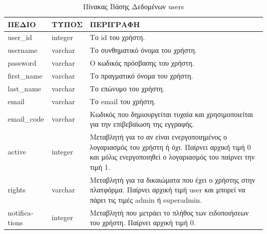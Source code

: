 \begin{table}[t]
\centering
\begin{tabular}{|m{2.5cm}|m{2cm}|m{9cm}|}
\hline
\rowcolor{gray} 
ΠΕΔΙΟ & ΤΥΠΟΣ & ΠΕΡΙΓΡΑΦΗ \\
\hline\hline
\textlatin{user\_id} & \textlatin{integer} & Το \textlatin{id} του χρήστη. \\ 
\textlatin{username} & \textlatin{varchar} & Το συνθηματικό όνομα του χρήστη. \\
\textlatin{password} & \textlatin{varchar} & Ο κωδικός πρόσβασης του χρήστη.  \\ 
\textlatin{first\_name} & \textlatin{varchar} & Το πραγματικό όνομα του χρήστη. \\ 
\textlatin{last\_name} & \textlatin{varchar} & Το επώνυμο του χρήστη. \\ 
\textlatin{email} & \textlatin{varchar} & Το \textlatin{email} του χρήστη. \\ 
\textlatin{email\_code} & \textlatin{varchar} & Κωδικός που δημιουργείται τυχαία και χρησιμοποιείται για την επιβεβαίωση της εγγραφής. \\
\textlatin{active} & \textlatin{integer} & Μεταβλητή για το αν είναι ενεργοποιημένος ο λογαριασμός του χρήστη ή όχι. Παίρνει αρχική τιμή 0 και μόλις ενεργοποιηθεί ο λογαριασμός του παίρνει την τιμή 1. \\ 
\textlatin{rights} & \textlatin{varchar} & Μεταβλητή για τα δικαιώματα που έχει ο χρήστης στην πλατφόρμα. Παίρνει αρχική τιμή \textlatin{user} και μπορεί να πάρει τις τιμές \textlatin{admin} ή \textlatin{superadmin.}\\
\textlatin{notifications} & \textlatin{integer} & Μεταβλητή που μετράει το πλήθος των ειδοποιήσεων του χρήστη. Παίρνει αρχική τιμή 0. \\ 
\hline
\end{tabular}
\caption{Πίνακας Βάσης Δεδομένων \textlatin{users}}
\label{table:users}
\end{table}




